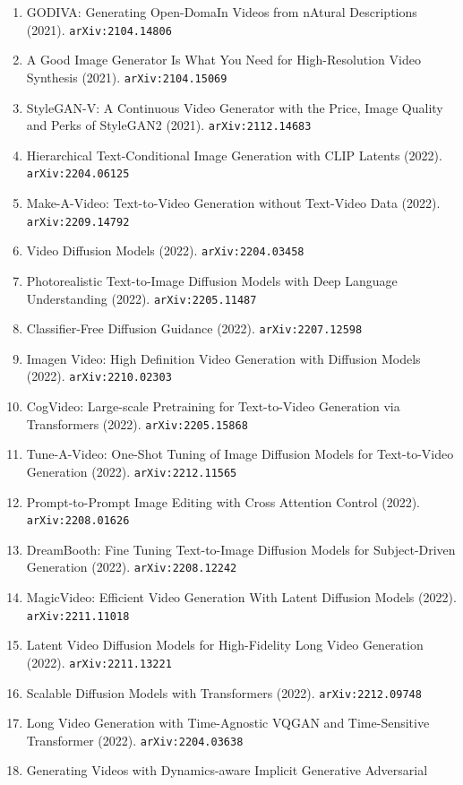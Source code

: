 \documentclass[11pt]{article}
\begin{document}
\begin{enumerate}
  \item GODIVA: Generating Open-DomaIn Videos from nAtural Descriptions (2021). \texttt{arXiv:2104.14806}
  \item A Good Image Generator Is What You Need for High-Resolution Video
  Synthesis (2021). \texttt{arXiv:2104.15069}
  \item StyleGAN-V: A Continuous Video Generator with the Price, Image Quality
  and Perks of StyleGAN2 (2021). \texttt{arXiv:2112.14683}
  \item Hierarchical Text-Conditional Image Generation with CLIP Latents (2022). \texttt{arXiv:2204.06125}
  \item Make-A-Video: Text-to-Video Generation without Text-Video Data (2022). \texttt{arXiv:2209.14792}
  \item Video Diffusion Models (2022). \texttt{arXiv:2204.03458}
  \item Photorealistic Text-to-Image Diffusion Models with Deep Language
  Understanding (2022). \texttt{arXiv:2205.11487}
  \item Classifier-Free Diffusion Guidance (2022). \texttt{arXiv:2207.12598}
  \item Imagen Video: High Definition Video Generation with Diffusion Models (2022). \texttt{arXiv:2210.02303}
  \item CogVideo: Large-scale Pretraining for Text-to-Video Generation via
  Transformers (2022). \texttt{arXiv:2205.15868}
  \item Tune-A-Video: One-Shot Tuning of Image Diffusion Models for
  Text-to-Video Generation (2022). \texttt{arXiv:2212.11565}
  \item Prompt-to-Prompt Image Editing with Cross Attention Control (2022). \texttt{arXiv:2208.01626}
  \item DreamBooth: Fine Tuning Text-to-Image Diffusion Models for
  Subject-Driven Generation (2022). \texttt{arXiv:2208.12242}
  \item MagicVideo: Efficient Video Generation With Latent Diffusion Models (2022). \texttt{arXiv:2211.11018}
  \item Latent Video Diffusion Models for High-Fidelity Long Video Generation (2022). \texttt{arXiv:2211.13221}
  \item Scalable Diffusion Models with Transformers (2022). \texttt{arXiv:2212.09748}
  \item Long Video Generation with Time-Agnostic VQGAN and Time-Sensitive
  Transformer (2022). \texttt{arXiv:2204.03638}
  \item Generating Videos with Dynamics-aware Implicit Generative Adversarial

\end{enumerate}
\end{document}
